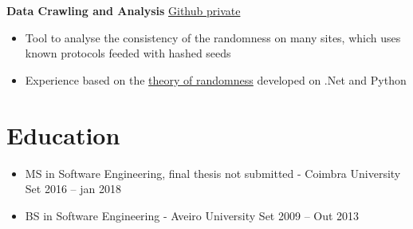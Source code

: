 \documentclass[11pt]{article}       %
\begin{document}
\textbf{Data Crawling and Analysis} \hfill \href{https://play.google.com/store/apps/details?id=pt.psilva.blackjackwizard.demo&pcampaignid=web_share}{Github private} \\
\vspace{-9pt}
\begin{itemize}
  \item Tool to analyse the consistency of the randomness on many sites, which uses known protocols feeded with hashed seeds
  \item Experience based on the \href{https://www.random.org/randomness/}{theory of randomness} developed on .Net and Python
\end{itemize}


\vspace{-18.5pt}

\section*{Education}
\begin{itemize}
\item MS in Software Engineering, final thesis not submitted - Coimbra University \hfill Set 2016 -- jan 2018 \\
\item BS in Software Engineering - Aveiro University \hfill Set 2009 -- Out 2013
\end{itemize}
\end{document}
